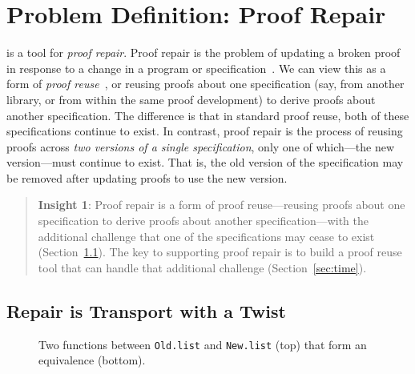 \section{Problem Definition: Proof Repair}
\label{sec:key1}

\toolname is a tool for \textit{proof repair}.
Proof repair is the problem of updating a broken proof in response to a change in a program or specification~\cite{PGL-045, pumpkinpatch}.
We can view this as a form of 
\textit{proof reuse}~\cite{Ringer2019, felty1994generalization, caplan1995logical, pons2000generalization, johnsen2004theorem}, %
or reusing proofs about one specification (say, from another library, or from within the same proof development)
to derive proofs about another specification.
The difference is that in standard proof reuse, both of these specifications continue to exist.
In contrast, proof repair is the process of reusing proofs across \textit{two versions of a single specification},
only one of which---the new version---must continue to exist.
That is, the old version of the specification may be removed after updating proofs to use the new version.

\begin{quote}
\textbf{Insight 1}:
Proof repair is a form of proof reuse---reusing proofs about one specification to derive proofs about another specification---with 
the additional challenge that one of the specifications may cease to exist (Section~\ref{sec:repair}).
The key to supporting proof repair is to build a proof reuse
tool that can handle that additional challenge (Section~\ref{sec:time}).
\end{quote}

\subsection{Repair is Transport with a Twist}
\label{sec:repair}

\begin{figure}
\vspace{-0.3cm}
\caption{Two functions between \lstinline{Old.list} and \lstinline{New.list} (top) that form an equivalence (bottom).}
\label{fig:equivalence}
\end{figure}

